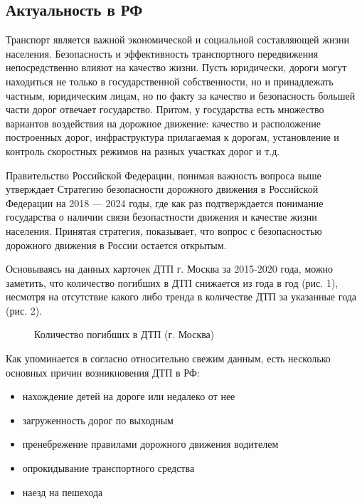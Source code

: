 \documentclass[a4paper, 14pt]{article}
\begin{document}
\subsection{Актуальность в РФ} 
Транспорт является важной экономической и социальной составляющей жизни населения. Безопасность и эффективность транспортного передвижения непосредственно влияют на качество жизни. Пусть юридически, дороги могут находиться не только в государственной собственности, но и принадлежать частным, юридическим лицам, но по факту за качество и безопасность большей части дорог отвечает государство. Притом, у государства есть множество вариантов воздействия на дорожное движение: качество и расположение построенных дорог, инфраструктура прилагаемая к дорогам, установление и контроль скоростных режимов на разных участках дорог и т.д. 

Правительство Российской Федерации, понимая важность вопроса выше утверждает Стратегию безопасности дорожного движения в Российской Федерации на 2018 --- 2024 годы, где как раз подтверждается понимание государства о наличии связи безопастности движения и качестве жизни населения. Принятая стратегия, показывает, что вопрос с безопасностью дорожного движения в России остается  открытым.

Основываясь на данных карточек ДТП г. Москва за 2015-2020 года, можно заметить, что количество погибших в ДТП снижается из года в год  (рис. 1), несмотря на отсутствие какого либо тренда в количестве ДТП за указанные года (рис. 2). %

\begin{figure}[h]\label{ris: pog_dynamics}
	\caption{Количество погибших в ДТП (г. Москва)}
\end{figure}

Как упоминается в \cite{kostych} согласно относительно свежим данным, есть несколько основных причин возникновения ДТП в РФ: 
\begin{itemize}
	\item нахождение детей на дороге или недалеко от нее
	\item загруженность дорог по выходным
	\item пренебрежение правилами дорожного движения водителем
	\item опрокидывание транспортного средства
	\item наезд на пешехода
\end{itemize}
\end{document}

